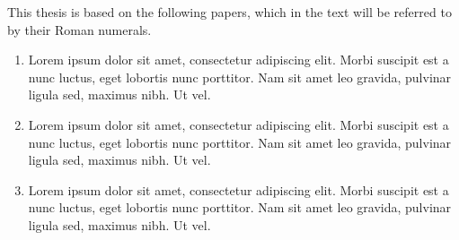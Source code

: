 \renewcommand{\theenumi}{\Roman{enumi}}
This thesis is based on the following papers, which in the text will
be referred to by their Roman numerals.

\begin{enumerate}
\raggedright \setlength{\parindent}{0pt}
\item Lorem ipsum dolor sit amet, consectetur adipiscing elit. Morbi suscipit est a nunc luctus, eget lobortis nunc porttitor. Nam sit amet leo gravida, pulvinar ligula sed, maximus nibh. Ut vel.
\item Lorem ipsum dolor sit amet, consectetur adipiscing elit. Morbi suscipit est a nunc luctus, eget lobortis nunc porttitor. Nam sit amet leo gravida, pulvinar ligula sed, maximus nibh. Ut vel.
\item Lorem ipsum dolor sit amet, consectetur adipiscing elit. Morbi suscipit est a nunc luctus, eget lobortis nunc porttitor. Nam sit amet leo gravida, pulvinar ligula sed, maximus nibh. Ut vel.
\end{enumerate}
\renewcommand{\theenumi}{\arabic{enumi}}
